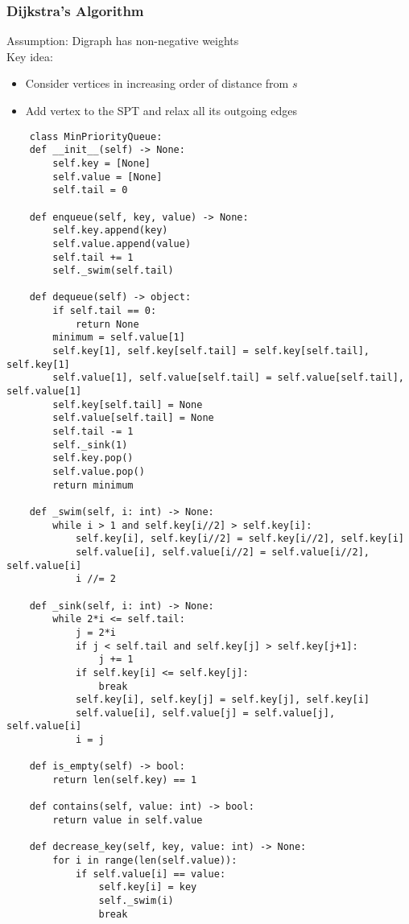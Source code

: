 \documentclass[a4paper]{article}
\begin{document}
\subsubsection*{Dijkstra's Algorithm}
Assumption: Digraph has non-negative weights\\
Key idea:
\begin{itemize}
    \item Consider vertices in increasing order of distance from $s$
    \item Add vertex to the SPT and relax all its outgoing edges
\end{itemize}

\begin{lstlisting}
    class MinPriorityQueue:
    def __init__(self) -> None:
        self.key = [None]
        self.value = [None]
        self.tail = 0

    def enqueue(self, key, value) -> None:
        self.key.append(key)
        self.value.append(value)
        self.tail += 1
        self._swim(self.tail)

    def dequeue(self) -> object:
        if self.tail == 0:
            return None
        minimum = self.value[1]
        self.key[1], self.key[self.tail] = self.key[self.tail], self.key[1]
        self.value[1], self.value[self.tail] = self.value[self.tail], self.value[1]
        self.key[self.tail] = None
        self.value[self.tail] = None
        self.tail -= 1
        self._sink(1)
        self.key.pop()
        self.value.pop()
        return minimum

    def _swim(self, i: int) -> None:
        while i > 1 and self.key[i//2] > self.key[i]:
            self.key[i], self.key[i//2] = self.key[i//2], self.key[i]
            self.value[i], self.value[i//2] = self.value[i//2], self.value[i]
            i //= 2

    def _sink(self, i: int) -> None:
        while 2*i <= self.tail:
            j = 2*i
            if j < self.tail and self.key[j] > self.key[j+1]:
                j += 1
            if self.key[i] <= self.key[j]:
                break
            self.key[i], self.key[j] = self.key[j], self.key[i]
            self.value[i], self.value[j] = self.value[j], self.value[i]
            i = j

    def is_empty(self) -> bool:
        return len(self.key) == 1

    def contains(self, value: int) -> bool:
        return value in self.value

    def decrease_key(self, key, value: int) -> None:
        for i in range(len(self.value)):
            if self.value[i] == value:
                self.key[i] = key
                self._swim(i)
                break
\end{lstlisting}
\end{document}
